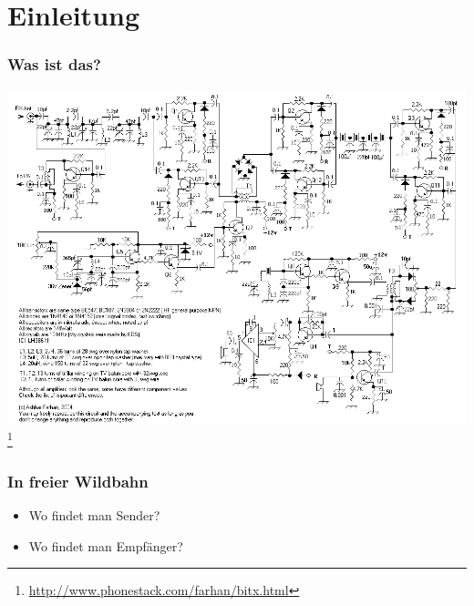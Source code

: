 

\subtitle{Technik 15: \\
           Sender- und Empfängertechnik \\[2em]}
\date{Stand 12.1.2015}



\section*{Einleitung}

\begin{frame}
    \frametitle{Was ist das?}
		\begin{center}
        	\includegraphics[width=.95\textwidth]{e15/bitx.png}
        \footnote{\tiny \url{http://www.phonestack.com/farhan/bitx.html}}
	\end{center}
\end{frame}

\begin{frame}
    \frametitle{In freier Wildbahn}
    \begin{itemize}
		\item Wo findet man Sender?
		\item Wo findet man Empfänger?
    \end{itemize}
\end{frame}

